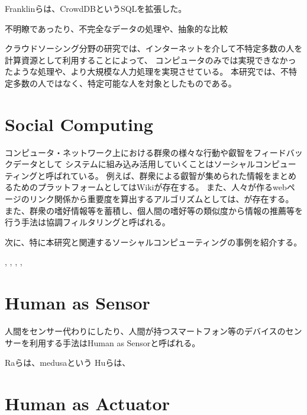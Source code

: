 Franklinらは、CrowdDBというSQLを拡張した。

不明瞭であったり、不完全なデータの処理や、抽象的な比較 \cite{crowddb}

\cite{cylog} \cite{crowdforge} \cite{community-based-crowdsourcing}

クラウドソーシング分野の研究では、インターネットを介して不特定多数の人を計算資源として利用することによって、
コンピュータのみでは実現できなかったような処理や、より大規模な人力処理を実現させている。
本研究では、不特定多数の人ではなく、特定可能な人を対象としたものである。

\section{Social Computing}\label{social-computing}

コンピュータ・ネットワーク上における群衆の様々な行動や叡智をフィードバックデータとして
システムに組み込み活用していくことはソーシャルコンピューティングと呼ばれている。
例えば、群衆による叡智が集められた情報をまとめるためのプラットフォームとしてはWiki\cite{wiki}が存在する。
また、人々が作るwebページのリンク関係から重要度を算出するアルゴリズムとしては、\cite{pagerank}が存在する。
また、群衆の嗜好情報等を蓄積し、個人間の嗜好等の類似度から情報の推薦等を行う手法は協調フィルタリングと呼ばれる\cite{collaborative-filtering}。

次に、特に本研究と関連するソーシャルコンピューティングの事例を紹介する。

\cite{dog}, \cite{jabberwocky}, \cite{social-machines},
\cite{personal-api},

\section{Human as Sensor}\label{human-as-sensor}

人間をセンサー代わりにしたり、人間が持つスマートフォン等のデバイスのセンサーを利用する手法はHuman
as Sensorと呼ばれる。

\cite{prism} \cite{moboq} Raらは、medusa\cite{Ra-medusa}という
Huらは、\cite{Hu:mobilecrowdsensing}

\section{Human as Actuator}\label{human-as-actuator}

\cite{hapticturk} \cite{sharedo} \cite{recipe-programming} \cite{cooky}
